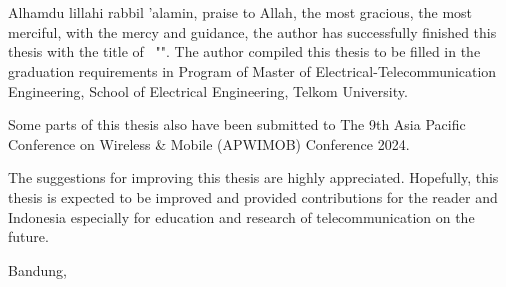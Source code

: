 \chapter*{\kataPengantar}
	Alhamdu lillahi rabbil 'alamin, praise to Allah, the most gracious, the most merciful, with the mercy and guidance, the author has successfully finished this thesis with the title of ~"\textbf{\Judul}". The author compiled this thesis to be filled in the graduation requirements in Program of Master of Electrical-Telecommunication Engineering, School of Electrical Engineering, Telkom University.
		
	Some parts of this thesis also have been submitted to The 9th Asia Pacific Conference on Wireless \& Mobile (APWIMOB) Conference 2024.
	
	The suggestions for improving this thesis are highly appreciated. Hopefully, this thesis is expected to be improved and provided contributions for the reader and Indonesia especially for education and research of telecommunication on the future.   

\vspace*{1 cm}
\begin{flushright}
Bandung, \tanggalPengesahan\\
\vspace*{2.75 cm}

\Penulis

\end{flushright}
